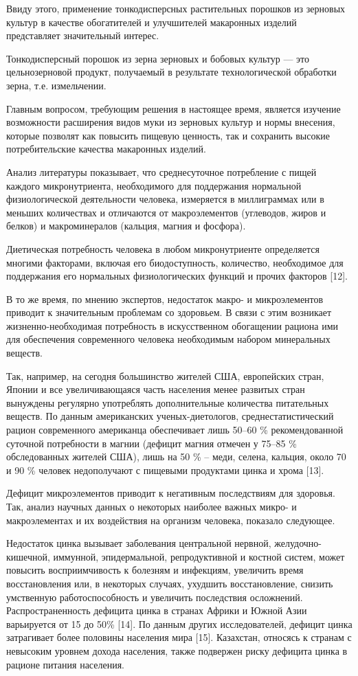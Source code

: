 Ввиду этого, применение тонкодисперсных растительных порошков из
зерновых культур в качестве обогатителей и улучшителей макаронных
изделий представляет значительный интерес.

Тонкодисперсный порошок из зерна зерновых и бобовых культур --- это
цельнозерновой продукт, получаемый в результате технологической
обработки зерна, т.е. измельчении.

Главным вопросом, требующим решения в настоящее время, является изучение
возможности расширения видов муки из зерновых культур и нормы внесения,
которые позволят как повысить пищевую ценность, так и сохранить высокие
потребительские качества макаронных изделий.

Анализ литературы показывает, что среднесуточное потребление с пищей
каждого микронутриента, необходимого для поддержания нормальной
физиологической деятельности человека, измеряется в миллиграммах или в
меньших количествах и отличаются от макроэлементов (углеводов, жиров и
белков) и макроминералов (кальция, магния и фосфора).

Диетическая потребность человека в любом микронутриенте определяется
многими факторами, включая его биодоступность, количество, необходимое
для поддержания его нормальных физиологических функций и прочих факторов
{[}12{]}.

В то же время, по мнению экспертов, недостаток макро- и микроэлементов
приводит к значительным проблемам со здоровьем. В связи с этим возникает
жизненно-необходимая потребность в искусственном обогащении рациона ими
для обеспечения современного человека необходимым набором минеральных
веществ.

Так, например, на сегодня большинство жителей США, европейских стран,
Японии и все увеличивающаяся часть населения менее развитых стран
вынуждены регулярно употреблять дополнительные количества питательных
веществ. По данным американских ученых-диетологов, среднестатистический
рацион современного американца обеспечивает лишь 50--60 \%
рекомендованной суточной потребности в магнии (дефицит магния отмечен у
75--85 \% обследованных жителей США), лишь на 50 \% -- меди, селена,
кальция, около 70 и 90 \% человек недополучают с пищевыми продуктами
цинка и хрома {[}13{]}.

Дефицит микроэлементов приводит к негативным последствиям для здоровья.
Так, анализ научных данных о некоторых наиболее важных микро- и
макроэлементах и их воздействия на организм человека, показало
следующее.

Недостаток цинка вызывает заболевания центральной нервной,
желудочно-кишечной, иммунной, эпидермальной, репродуктивной и костной
систем, может повысить восприимчивость к болезням и инфекциям, увеличить
время восстановления или, в некоторых случаях, ухудшить восстановление,
снизить умственную работоспособность и увеличить последствия осложнений.
Распространенность дефицита цинка в странах Африки и Южной Азии
варьируется от 15 до 50\% {[}14{]}. По данным других исследователей,
дефицит цинка затрагивает более половины населения мира {[}15{]}.
Казахстан, относясь к странам с невысоким уровнем дохода населения,
также подвержен риску дефицита цинка в рационе питания населения.

